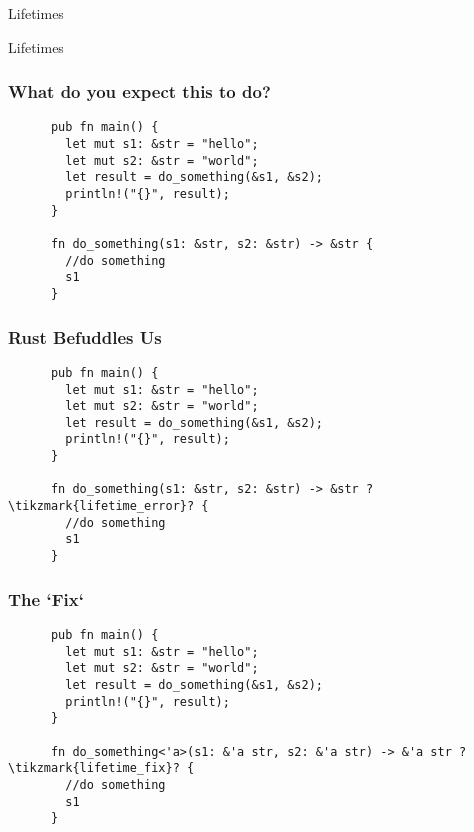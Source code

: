 \begin{section}{Lifetimes}

  \begin{frame}
    \centerline{
      \huge{Lifetimes}
    }
  \end{frame}

  \begin{frame}[fragile]
    \frametitle{What do you expect this to do?}
    \begin{verbatim}
      pub fn main() {
        let mut s1: &str = "hello";
        let mut s2: &str = "world";
        let result = do_something(&s1, &s2);
        println!("{}", result);
      }

      fn do_something(s1: &str, s2: &str) -> &str {
        //do something
        s1
      }
    \end{verbatim}
  \end{frame}


  \begin{frame}[fragile]
    \frametitle{Rust Befuddles Us}
    \begin{verbatim}
      pub fn main() {
        let mut s1: &str = "hello";
        let mut s2: &str = "world";
        let result = do_something(&s1, &s2);
        println!("{}", result);
      }

      fn do_something(s1: &str, s2: &str) -> &str ?\tikzmark{lifetime_error}? {
        //do something
        s1
      }
    \end{verbatim}
  \end{frame}

  \begin{frame}[fragile]
    \frametitle{The `Fix`}
    \begin{verbatim}
      pub fn main() {
        let mut s1: &str = "hello";
        let mut s2: &str = "world";
        let result = do_something(&s1, &s2);
        println!("{}", result);
      }

      fn do_something<'a>(s1: &'a str, s2: &'a str) -> &'a str ?\tikzmark{lifetime_fix}? {
        //do something
        s1
      }
    \end{verbatim}
  \end{frame}


\end{section}

